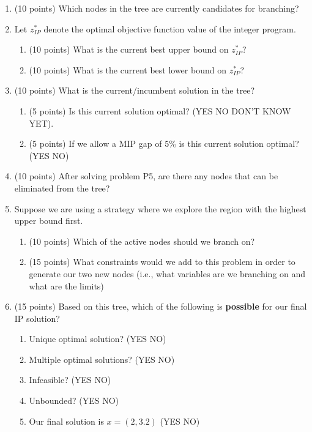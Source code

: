 \documentclass[letterpaper,oneside,12pt]{article}%
\begin{document}
\begin{enumerate}
\item (10 points) Which nodes in the tree are currently candidates for branching? \vfill
\item Let $z^*_{IP}$ denote the optimal objective function value of the integer program. 
	\begin{enumerate}
	\item (10 points) What is the current best upper bound on $z^*_{IP}$? \vfill
	\item (10 points) What is the current best lower bound on $z^*_{IP}$? \vfill
	\end{enumerate}	 
\newpage
\item (10 points) What is the current/incumbent solution in the tree? \vfill
	\begin{enumerate}
	\item (5 points) Is this current solution optimal? (YES \hspace{0.5cm} NO \hspace{0.5cm} DON'T KNOW YET). \vfill
	\item (5 points) If we allow a MIP gap of 5\% is this current solution optimal? (YES \hspace{0.5cm} NO) \vfill
	\end{enumerate}
\item (10 points) After solving problem P5, are there any nodes that can be eliminated from the tree? \vfill
\item Suppose we are using a strategy where we explore the region with the highest upper bound first.
	\begin{enumerate}
	\item (10 points) Which of the active nodes should we branch on? \vfill
	\item (15 points) What constraints would we add to this problem in order to generate our two new nodes (i.e., what variables are we branching on and what are the limits) \vfill
	\end{enumerate}
\item (15 points) Based on this tree, which of the following is \textbf{possible} for our final IP solution?
	\begin{enumerate}
	\item Unique optimal solution? (YES \hspace{0.5cm} NO)
	\item Multiple optimal solutions? (YES \hspace{0.5cm} NO)
	\item Infeasible? (YES \hspace{0.5cm} NO)
	\item Unbounded? (YES \hspace{0.5cm} NO)
	\item Our final solution is $x = (2,3.2)$ (YES \hspace{0.5cm} NO)
	\end{enumerate}
\end{enumerate}
\end{document}
